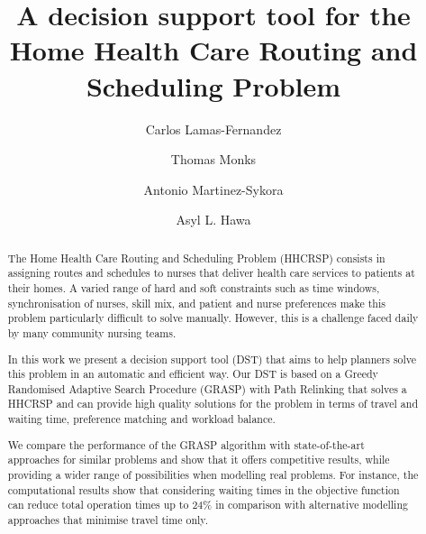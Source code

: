 \documentclass[a4paper,11pt,authoryear]{elsarticle}
\begin{document}
\begin{frontmatter}

\title{A decision support tool for the Home Health Care Routing and Scheduling Problem}

\author[1]{Carlos Lamas-Fernandez}
\address[1]{Southampton Business School, University of Southampton, Southampton SO17 1BJ, UK}

\author[2]{Thomas Monks}
\address[2]{University of Exeter Medical School, University of Exeter, Exeter, UK}
\author[1]{Antonio Martinez-Sykora}

\author[1]{Asyl L. Hawa}

\begin{abstract}
The Home Health Care Routing and Scheduling Problem (HHCRSP) consists in assigning routes and schedules to nurses that deliver health care services to patients at their homes. A varied range of hard and soft constraints such as time windows, synchronisation of nurses, skill mix, and patient and nurse preferences make this problem particularly difficult to solve manually. However, this is a challenge faced daily by many community nursing teams.

In this work we present a decision support tool (DST) that aims to help planners solve this problem in an automatic and efficient way. Our DST is based on a Greedy Randomised Adaptive Search Procedure (GRASP) with Path Relinking that solves a HHCRSP and can provide high quality solutions for the problem in terms of travel and waiting time, preference matching and workload balance. 


We compare the performance of the GRASP algorithm with state-of-the-art approaches for similar problems and show that it offers competitive results, while providing a wider range of possibilities when modelling real problems. For instance, the computational results show that considering waiting times in the objective function can reduce total operation times up to 24\% in comparison with alternative modelling approaches that minimise travel time only.


\end{abstract}
\end{frontmatter}
\end{document}
